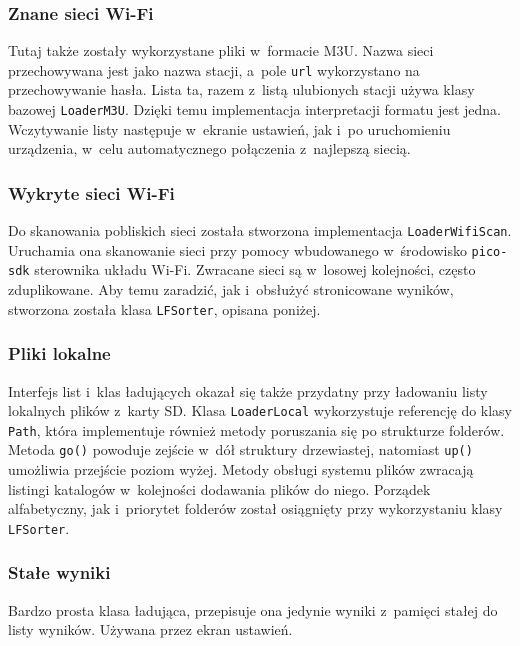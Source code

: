 \documentclass[polish]{aghengthesis}
\begin{document}
			\subsubsection{Znane sieci Wi-Fi}
				Tutaj także zostały wykorzystane pliki w~formacie M3U. Nazwa sieci przechowywana jest jako nazwa stacji, a~pole \lstinline|url| wykorzystano na przechowywanie hasła. Lista ta, razem z~listą ulubionych stacji używa klasy bazowej \lstinline|LoaderM3U|. Dzięki temu implementacja interpretacji formatu jest jedna. Wczytywanie listy następuje w~ekranie ustawień, jak i~po uruchomieniu urządzenia, w~celu automatycznego połączenia z~najlepszą siecią.
				
			\subsubsection{Wykryte sieci Wi-Fi}
				Do skanowania pobliskich sieci została stworzona implementacja \lstinline|LoaderWifiScan|. Uruchamia ona skanowanie sieci przy pomocy wbudowanego w~środowisko \lstinline|pico-sdk| sterownika układu Wi-Fi. Zwracane sieci są w~losowej kolejności, często zduplikowane. Aby temu zaradzić, jak i~obsłużyć stronicowane wyników, stworzona została klasa \lstinline|LFSorter|, opisana poniżej.
				
			\subsubsection{Pliki lokalne}
				Interfejs list i~klas ładujących okazał się także przydatny przy ładowaniu listy lokalnych plików z~karty SD. Klasa \lstinline|LoaderLocal| wykorzystuje referencję do klasy \lstinline|Path|, która implementuje również metody poruszania się po strukturze folderów. Metoda \lstinline|go()| powoduje zejście w~dół struktury drzewiastej, natomiast \lstinline|up()| umożliwia przejście poziom wyżej. Metody obsługi systemu plików zwracają listingi katalogów w~kolejności dodawania plików do niego. Porządek alfabetyczny, jak i~priorytet folderów został osiągnięty przy wykorzystaniu klasy \lstinline|LFSorter|.
				
			\subsubsection{Stałe wyniki}
				Bardzo prosta klasa ładująca, przepisuje ona jedynie wyniki z~pamięci stałej do listy wyników. Używana przez ekran ustawień.
				
\end{document}
